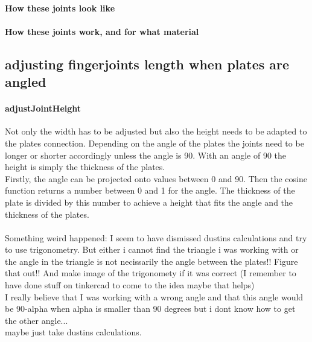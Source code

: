 \documentclass[../ClassicThesis.tex]{subfiles}
\begin{document}
    \paragraph{How these joints look like}
    \paragraph{How these joints work, and for what material}

\subsection{adjusting fingerjoints length when plates are angled}
    \paragraph{adjustJointHeight}
    Not only the width has to be adjusted but also the height needs to be adapted to the plates connection. Depending on the angle of the plates the joints need to be longer or shorter accordingly unless the angle is 90. With an angle of 90 the height is simply the thickness of the plates. \\
    Firstly, the angle can be projected onto values between 0 and 90. Then the cosine function returns a number between 0 and 1 for the angle. The thickness of the plate is divided by this number to achieve a height that fits the angle and the thickness of the plates. \\
    \\
    Something weird happened: I seem to have dismissed dustins calculations and try to use trigonometry. But either i cannot find the triangle i was working with or the angle in the triangle is not necissarily the angle between the plates!! Figure that out!! And make image of the trigonomety if it was correct (I remember to have done stuff on tinkercad to come to the idea maybe that helps)\\
    I really believe that I was working with a wrong angle and that this angle would be 90-alpha when alpha is smaller than 90 degrees but i dont know how to get the other angle...\\ maybe just take dustins calculations.
\end{document}
